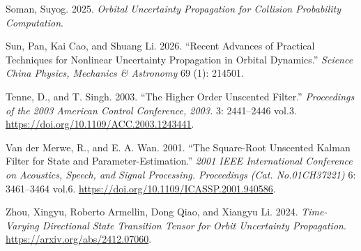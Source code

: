 \documentclass[
  letterpaper,
  DIV=11,
  numbers=noendperiod,
  oneside]{scrartcl}
\newlength{\cslhangindent}
\newenvironment{CSLReferences}[2] %
 {\begin{list}{}{%
  \setlength{\itemindent}{0pt}
  \setlength{\leftmargin}{0pt}
  \setlength{\parsep}{0pt}
  \ifodd #1
   \setlength{\leftmargin}{\cslhangindent}
   \setlength{\itemindent}{-1\cslhangindent}
  \fi
  \setlength{\itemsep}{#2\baselineskip}}}
 {\end{list}}
\begin{document}
\begin{CSLReferences}{1}{1}
Soman, Suyog. 2025. \emph{Orbital Uncertainty Propagation for Collision
Probability Computation}.

Sun, Pan, Kai Cao, and Shuang Li. 2026. {``Recent Advances of Practical
Techniques for Nonlinear Uncertainty Propagation in Orbital Dynamics.''}
\emph{Science China Physics, Mechanics \& Astronomy} 69 (1): 214501.

Tenne, D., and T. Singh. 2003. {``The Higher Order Unscented Filter.''}
\emph{Proceedings of the 2003 American Control Conference, 2003.} 3:
2441--2446 vol.3. \url{https://doi.org/10.1109/ACC.2003.1243441}.

Van der Merwe, R., and E. A. Wan. 2001. {``The Square-Root Unscented
Kalman Filter for State and Parameter-Estimation.''} \emph{2001 IEEE
International Conference on Acoustics, Speech, and Signal Processing.
Proceedings (Cat. No.01CH37221)} 6: 3461--3464 vol.6.
\url{https://doi.org/10.1109/ICASSP.2001.940586}.

Zhou, Xingyu, Roberto Armellin, Dong Qiao, and Xiangyu Li. 2024.
\emph{Time-Varying Directional State Transition Tensor for Orbit
Uncertainty Propagation}. \url{https://arxiv.org/abs/2412.07060}.

\end{CSLReferences}
\end{document}

